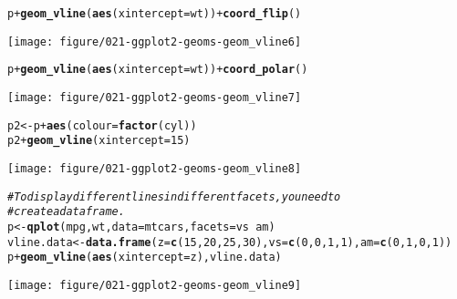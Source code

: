 \documentclass[a4paper,titlepage]{tufte-handout}\usepackage[]{graphicx}\usepackage[]{color}
\makeatletter
\def\maxwidth{ %
  \ifdim\Gin@nat@width>\linewidth
    \linewidth
  \else
    \Gin@nat@width
  \fi
}
\newcommand{\hlnum}[1]{\textcolor[rgb]{0.686,0.059,0.569}{#1}}%
\newcommand{\hlcom}[1]{\textcolor[rgb]{0.678,0.584,0.686}{\textit{#1}}}%
\newcommand{\hlopt}[1]{\textcolor[rgb]{0,0,0}{#1}}%
\newcommand{\hlstd}[1]{\textcolor[rgb]{0.345,0.345,0.345}{#1}}%
\newcommand{\hlkwb}[1]{\textcolor[rgb]{0.69,0.353,0.396}{#1}}%
\newcommand{\hlkwc}[1]{\textcolor[rgb]{0.333,0.667,0.333}{#1}}%
\newcommand{\hlkwd}[1]{\textcolor[rgb]{0.737,0.353,0.396}{\textbf{#1}}}%
\newenvironment{kframe}{%
 \def\at@end@of@kframe{}%
 \ifinner\ifhmode%
  \def\at@end@of@kframe{\end{minipage}}%
  \begin{minipage}{\columnwidth}%
 \fi\fi%
 \def\FrameCommand##1{\hskip\@totalleftmargin \hskip-\fboxsep
 \colorbox{shadecolor}{##1}\hskip-\fboxsep
     \hskip-\linewidth \hskip-\@totalleftmargin \hskip\columnwidth}%
 \MakeFramed {\advance\hsize-\width
   \@totalleftmargin\z@ \linewidth\hsize
   \@setminipage}}%
 {\par\unskip\endMakeFramed%
 \at@end@of@kframe}
\newenvironment{knitrout}{}{} %
\makeatother
\begin{document}
\begin{knitrout}
\begin{kframe}
\begin{alltt}
\hlstd{p} \hlopt{+} \hlkwd{geom_vline}\hlstd{(}\hlkwd{aes}\hlstd{(}\hlkwc{xintercept} \hlstd{= wt))} \hlopt{+} \hlkwd{coord_flip}\hlstd{()}
\end{alltt}
\end{kframe}
\texttt{[image: figure/021-ggplot2-geoms-geom\_vline6]} 
\begin{kframe}\begin{alltt}
\hlstd{p} \hlopt{+} \hlkwd{geom_vline}\hlstd{(}\hlkwd{aes}\hlstd{(}\hlkwc{xintercept} \hlstd{= wt))} \hlopt{+} \hlkwd{coord_polar}\hlstd{()}
\end{alltt}
\end{kframe}
\texttt{[image: figure/021-ggplot2-geoms-geom\_vline7]} 
\begin{kframe}\begin{alltt}
\hlstd{p2} \hlkwb{<-} \hlstd{p} \hlopt{+} \hlkwd{aes}\hlstd{(}\hlkwc{colour} \hlstd{=} \hlkwd{factor}\hlstd{(cyl))}
\hlstd{p2} \hlopt{+} \hlkwd{geom_vline}\hlstd{(}\hlkwc{xintercept} \hlstd{=} \hlnum{15}\hlstd{)}
\end{alltt}
\end{kframe}
\texttt{[image: figure/021-ggplot2-geoms-geom\_vline8]} 
\begin{kframe}\begin{alltt}
\hlcom{# To display different lines in different facets, you need to}
\hlcom{# create a data frame.}
\hlstd{p} \hlkwb{<-} \hlkwd{qplot}\hlstd{(mpg, wt,} \hlkwc{data}\hlstd{=mtcars,} \hlkwc{facets} \hlstd{= vs} \hlopt{~} \hlstd{am)}
\hlstd{vline.data} \hlkwb{<-} \hlkwd{data.frame}\hlstd{(}\hlkwc{z} \hlstd{=} \hlkwd{c}\hlstd{(}\hlnum{15}\hlstd{,} \hlnum{20}\hlstd{,} \hlnum{25}\hlstd{,} \hlnum{30}\hlstd{),} \hlkwc{vs} \hlstd{=} \hlkwd{c}\hlstd{(}\hlnum{0}\hlstd{,} \hlnum{0}\hlstd{,} \hlnum{1}\hlstd{,} \hlnum{1}\hlstd{),} \hlkwc{am} \hlstd{=} \hlkwd{c}\hlstd{(}\hlnum{0}\hlstd{,} \hlnum{1}\hlstd{,} \hlnum{0}\hlstd{,} \hlnum{1}\hlstd{))}
\hlstd{p} \hlopt{+} \hlkwd{geom_vline}\hlstd{(}\hlkwd{aes}\hlstd{(}\hlkwc{xintercept} \hlstd{= z), vline.data)}
\end{alltt}
\end{kframe}
\texttt{[image: figure/021-ggplot2-geoms-geom\_vline9]} 
\begin{kframe}\begin{alltt}


\end{alltt}
\end{kframe}
\end{knitrout}
\end{document}

